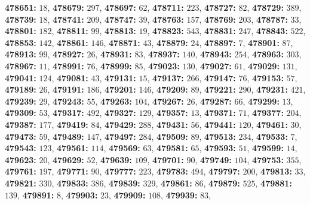 \textsf{\bfseries 478651:} $18$, \textsf{\bfseries 478679:} $297$, \textsf{\bfseries 478697:} $62$, \textsf{\bfseries 478711:} $223$, \textsf{\bfseries 478727:} $82$, \textsf{\bfseries 478729:} $389$, \textsf{\bfseries 478739:} $18$, \textsf{\bfseries 478741:} $209$, \textsf{\bfseries 478747:} $39$, \textsf{\bfseries 478763:} $157$, \textsf{\bfseries 478769:} $203$, \textsf{\bfseries 478787:} $33$, \textsf{\bfseries 478801:} $182$, \textsf{\bfseries 478811:} $99$, \textsf{\bfseries 478813:} $19$, \textsf{\bfseries 478823:} $543$, \textsf{\bfseries 478831:} $247$, \textsf{\bfseries 478843:} $522$, \textsf{\bfseries 478853:} $142$, \textsf{\bfseries 478861:} $146$, \textsf{\bfseries 478871:} $43$, \textsf{\bfseries 478879:} $24$, \textsf{\bfseries 478897:} $7$, \textsf{\bfseries 478901:} $87$, \textsf{\bfseries 478913:} $99$, \textsf{\bfseries 478927:} $26$, \textsf{\bfseries 478931:} $83$, \textsf{\bfseries 478937:} $140$, \textsf{\bfseries 478943:} $254$, \textsf{\bfseries 478963:} $303$, \textsf{\bfseries 478967:} $11$, \textsf{\bfseries 478991:} $76$, \textsf{\bfseries 478999:} $85$, \textsf{\bfseries 479023:} $130$, \textsf{\bfseries 479027:} $61$, \textsf{\bfseries 479029:} $131$, \textsf{\bfseries 479041:} $124$, \textsf{\bfseries 479081:} $43$, \textsf{\bfseries 479131:} $15$, \textsf{\bfseries 479137:} $266$, \textsf{\bfseries 479147:} $76$, \textsf{\bfseries 479153:} $57$, \textsf{\bfseries 479189:} $26$, \textsf{\bfseries 479191:} $186$, \textsf{\bfseries 479201:} $146$, \textsf{\bfseries 479209:} $89$, \textsf{\bfseries 479221:} $290$, \textsf{\bfseries 479231:} $421$, \textsf{\bfseries 479239:} $29$, \textsf{\bfseries 479243:} $55$, \textsf{\bfseries 479263:} $104$, \textsf{\bfseries 479267:} $26$, \textsf{\bfseries 479287:} $66$, \textsf{\bfseries 479299:} $13$, \textsf{\bfseries 479309:} $53$, \textsf{\bfseries 479317:} $492$, \textsf{\bfseries 479327:} $129$, \textsf{\bfseries 479357:} $13$, \textsf{\bfseries 479371:} $71$, \textsf{\bfseries 479377:} $204$, \textsf{\bfseries 479387:} $177$, \textsf{\bfseries 479419:} $84$, \textsf{\bfseries 479429:} $288$, \textsf{\bfseries 479431:} $56$, \textsf{\bfseries 479441:} $120$, \textsf{\bfseries 479461:} $30$, \textsf{\bfseries 479473:} $59$, \textsf{\bfseries 479489:} $147$, \textsf{\bfseries 479497:} $284$, \textsf{\bfseries 479509:} $89$, \textsf{\bfseries 479513:} $234$, \textsf{\bfseries 479533:} $7$, \textsf{\bfseries 479543:} $123$, \textsf{\bfseries 479561:} $114$, \textsf{\bfseries 479569:} $63$, \textsf{\bfseries 479581:} $65$, \textsf{\bfseries 479593:} $51$, \textsf{\bfseries 479599:} $14$, \textsf{\bfseries 479623:} $20$, \textsf{\bfseries 479629:} $52$, \textsf{\bfseries 479639:} $109$, \textsf{\bfseries 479701:} $90$, \textsf{\bfseries 479749:} $104$, \textsf{\bfseries 479753:} $355$, \textsf{\bfseries 479761:} $197$, \textsf{\bfseries 479771:} $90$, \textsf{\bfseries 479777:} $223$, \textsf{\bfseries 479783:} $494$, \textsf{\bfseries 479797:} $200$, \textsf{\bfseries 479813:} $33$, \textsf{\bfseries 479821:} $330$, \textsf{\bfseries 479833:} $386$, \textsf{\bfseries 479839:} $329$, \textsf{\bfseries 479861:} $86$, \textsf{\bfseries 479879:} $525$, \textsf{\bfseries 479881:} $139$, \textsf{\bfseries 479891:} $8$, \textsf{\bfseries 479903:} $23$, \textsf{\bfseries 479909:} $108$, \textsf{\bfseries 479939:} $83$, 

